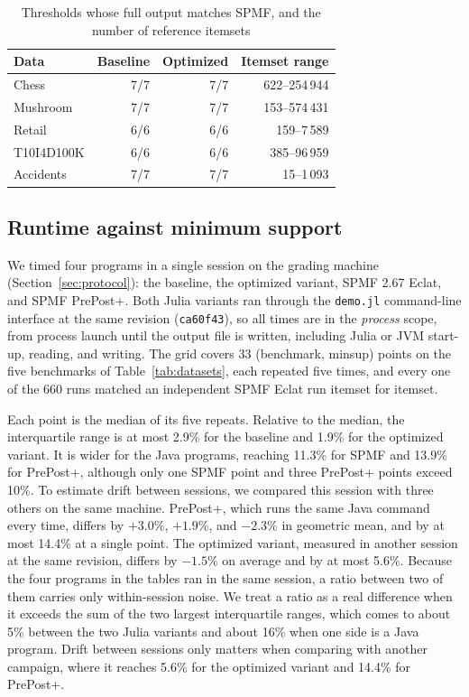 \begin{table}[t]
\centering
\caption{Thresholds whose full output matches SPMF, and the number of reference itemsets}
\label{tab:bench-exact}
\begin{tabular}{lrrr}
\hline
Data & Baseline & Optimized & Itemset range \\
\hline
Chess & 7/7 & 7/7 & 622--254\,944 \\
Mushroom & 7/7 & 7/7 & 153--574\,431 \\
Retail & 6/6 & 6/6 & 159--7\,589 \\
T10I4D100K & 6/6 & 6/6 & 385--96\,959 \\
Accidents & 7/7 & 7/7 & 15--1\,093 \\
\hline
\end{tabular}
\end{table}

\subsection{Runtime against minimum support}
\label{sec:minsup}
We timed four programs in a single session on the grading machine
(Section~\ref{sec:protocol}): the baseline, the optimized variant, SPMF 2.67 Eclat, and
SPMF PrePost+. Both Julia variants ran through the \texttt{demo.jl} command-line
interface at the same revision (\texttt{ca60f43}), so all times are in the
\emph{process} scope, from process launch until the output file is written, including
Julia or JVM start-up, reading, and writing. The grid covers 33 (benchmark, minsup) points
on the five benchmarks of Table~\ref{tab:datasets}, each repeated five times, and every
one of the 660 runs matched an independent SPMF Eclat run itemset for itemset.

Each point is the median of its five repeats. Relative to the median, the interquartile
range is at most 2.9\% for the baseline and 1.9\% for the optimized variant. It is wider
for the Java programs, reaching 11.3\% for SPMF and 13.9\% for PrePost+, although only one
SPMF point and three PrePost+ points exceed 10\%. To estimate drift between sessions, we
compared this session with three others on the same machine. PrePost+, which runs the same
Java command every time, differs by $+3.0\%$, $+1.9\%$, and $-2.3\%$ in geometric mean,
and by at most 14.4\% at a single point. The optimized variant, measured in another session
at the same revision, differs by $-1.5\%$ on average and by at most 5.6\%. Because the four
programs in the tables ran in the same session, a ratio between two of them carries only
within-session noise. We treat a ratio as a real difference when it exceeds the sum of
the two largest interquartile ranges, which comes to about 5\% between the two Julia
variants and about 16\% when one side is a Java program. Drift between sessions only
matters when comparing with another campaign, where it reaches 5.6\% for the optimized
variant and 14.4\% for PrePost+.

